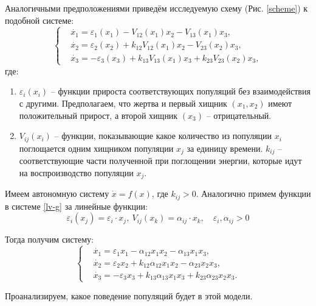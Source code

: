     Аналогичными предположениями приведём исследуемую схему (Рис. \ref{scheme}) к подобной системе:   
    \begin{equation}
        \left\{\begin{split}
            & \dot{x_1} = \varepsilon_1(x_1) - V_{12}(x_1)x_2 - V_{13}(x_1)x_3, \\
            & \dot{x_2} = \varepsilon_2(x_2) + k_{12} V_{12}(x_1)x_2 - V_{23}(x_2)x_3, \\
            & \dot{x_3} = -\varepsilon_3(x_3) + k_{13} V_{13}(x_1)x_3 + k_{23} V_{23}(x_2)x_3,
        \end{split}\right. \label{lv-g}
    \end{equation}
    где:
    \begin{enumerate}
        \item \( \varepsilon_i(x_i) \) -- функции прироста соответствующих популяций без взаимодействия с другими. Предполагаем, что жертва и первый хищник \(( x_1, x_2) \) имеют положительный прирост, а второй хищник \(( x_3 )\) -- отрицательный.
        \item \( V_{ij} (x_i) \) -- функции, показывающие какое количество из популяции \(x_i\) поглощается одним хищником популяции \( x_j \) за единицу времени. \(k_{ij}\) -- соответствующие части полученной при поглощении энергии, которые идут на воспроизводство популяции \(x_j\).
    \end{enumerate}
 
    Имеем автономную систему \( \dot{x} = f(x) \), где \( k_{ij} > 0 \). Аналогично примем функции в системе \eqref{lv-g} за линейные функции: 
    \[ \varepsilon_i(x_j) = \varepsilon_i \cdot x_j, ~ V_{ij}(x_k) = \alpha_{ij} \cdot x_k, \quad \varepsilon_i, \alpha_{ij} > 0 \]

    Тогда получим систему:
    \begin{equation}
        \left\{\begin{split}
            & \dot{x_1} = \varepsilon_1 x_1 - \alpha_{12} x_1 x_2 - \alpha_{13} x_1 x_3, \\
            & \dot{x_2} = \varepsilon_2 x_2 + k_{12} \alpha_{12} x_1 x_2 - \alpha_{23} x_2 x_3, \\
            & \dot{x_3} = -\varepsilon_3 x_3 + k_{13} \alpha_{13} x_1 x_3 + k_{23} \alpha_{23} x_2 x_3. 
        \end{split}\right. \label{lv-gl}
    \end{equation}

    Проанализируем, какое поведение популяций будет в этой модели.
